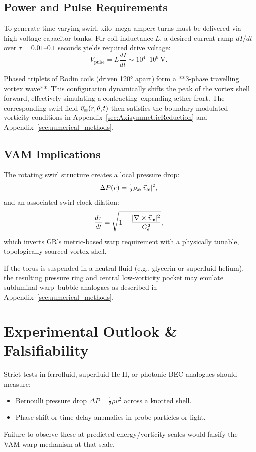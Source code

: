 \documentclass[preprint,notitlepage]{revtex4-2}
\begin{document}
    \subsection{Power and Pulse Requirements}
    
    To generate time-varying swirl, kilo–mega ampere-turns must be delivered via high-voltage capacitor banks. For coil inductance $L$, a desired current ramp $dI/dt$ over $\tau = 0.01$–$0.1$ seconds yields required drive voltage:
    \begin{equation}
    V_{\text{pulse}} = L \frac{dI}{dt} \sim 10^4\text{–}10^6\ \text{V}.
    \end{equation}
    
    Phased triplets of Rodin coils (driven 120° apart) form a **3-phase travelling vortex wave**. This configuration dynamically shifts the peak of the vortex shell forward, effectively simulating a contracting–expanding æther front. The corresponding swirl field $\vec{v}_{\text{\text{\ae}}}(r,\theta,t)$ then satisfies the boundary-modulated vorticity conditions in Appendix~\ref{sec:AxisymmetricReduction} and Appendix~\ref{sec:numerical_methods}.
    
    \subsection{VAM Implications}
    
    The rotating swirl structure creates a local pressure drop:
    \[
    \Delta P(r) = \tfrac{1}{2} \rho_{\text{\ae}} |\vec{v}_{\text{\text{\ae}}}|^2,
    \]
    and an associated swirl-clock dilation:
    \[
    \frac{d\tau}{dt} = \sqrt{1 - \frac{|\nabla \times \vec{v}_{\text{\text{\ae}}}|^2}{C_e^2}},
    \]
    which inverts GR’s metric-based warp requirement with a physically tunable, topologically sourced vortex shell.
    
    If the torus is suspended in a neutral fluid (e.g., glycerin or superfluid helium), the resulting pressure ring and central low-vorticity pocket may emulate subluminal warp–bubble analogues as described in Appendix~\ref{sec:numerical_methods}.
    

\section{Experimental Outlook \& Falsifiability}
    Strict tests in ferrofluid, superfluid He II, or photonic‐BEC analogues should measure:
    \begin{itemize}
      \item Bernoulli pressure drop $\Delta P=\tfrac12\rho v^2$ across a knotted shell.
      \item Phase‐shift or time‐delay anomalies in probe particles or light.
    \end{itemize}
    Failure to observe these at predicted energy/vorticity scales would falsify the VAM warp mechanism at that scale.
\end{document}

